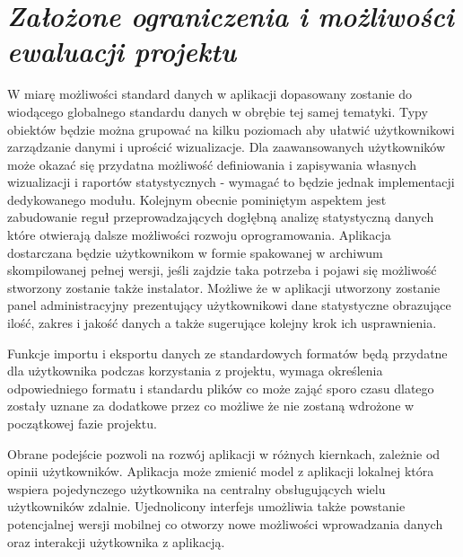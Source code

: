 \documentclass[a4paper,10pt, twoside]{report}
\newcommand{\customstylechapter}[1]{\large{\textit{#1}}}
\begin{document}

\chapter{\customstylechapter{Założone ograniczenia i możliwości ewaluacji projektu}}
{W miarę możliwości standard danych w aplikacji dopasowany zostanie do wiodącego
 globalnego standardu danych w obrębie tej samej tematyki. Typy obiektów będzie
 można grupować na kilku poziomach aby ułatwić użytkownikowi zarządzanie danymi
 i uprościć wizualizacje. Dla zaawansowanych użytkowników może okazać się 
przydatna możliwość definiowania i zapisywania własnych wizualizacji i raportów 
statystycznych - wymagać to będzie jednak implementacji dedykowanego modułu. 
Kolejnym obecnie pominiętym aspektem jest zabudowanie reguł przeprowadzających 
dogłębną analizę statystyczną danych które otwierają dalsze możliwości rozwoju 
oprogramowania. Aplikacja dostarczana będzie użytkownikom w formie spakowanej w
archiwum skompilowanej pełnej wersji, jeśli zajdzie taka potrzeba i pojawi się 
możliwość stworzony zostanie także instalator. Możliwe że w aplikacji utworzony 
zostanie panel administracyjny prezentujący użytkownikowi dane statystyczne 
obrazujące ilość, zakres i jakość danych a także sugerujące kolejny krok ich 
usprawnienia.}

{Funkcje importu i eksportu danych ze standardowych formatów będą przydatne dla 
użytkownika podczas korzystania z projektu, wymaga określenia odpowiedniego 
formatu i standardu plików co może zająć sporo czasu dlatego zostały uznane za 
dodatkowe przez co możliwe że nie zostaną wdrożone w początkowej fazie projektu.}

{Obrane podejście pozwoli na rozwój aplikacji w różnych kiernkach, zależnie od 
opinii użytkowników. Aplikacja może zmienić model z aplikacji lokalnej która 
wspiera pojedynczego użytkownika na centralny obsługujących wielu użytkowników 
zdalnie. Ujednolicony interfejs umożliwia także powstanie potencjalnej wersji 
mobilnej co otworzy nowe możliwości wprowadzania danych oraz interakcji 
użytkownika z aplikacją.}
\end{document}
